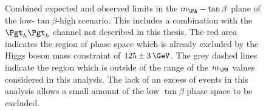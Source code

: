 \begin{figure}
\begin{center}

\end{center}
\caption[Combined expected and observed limits in the $m_{\PA}-\tan\beta$ plane
of the low-$\tan\beta$-high scenario.]{
Combined expected and observed limits in the $m_{\PA}-\tan\beta$ plane
of the low-$\tan\beta$-high scenario.
This includes a combination with the $\tautau$ channel not
described in this thesis. The red area indicates the region of phase space which is already
excluded by the Higgs boson mass constraint of $125\pm3\,\GeV$. The grey dashed
lines indicate the region which is outside of the range of the $m_{\PH}$ values
considered in this analysis. The lack of an excess of events in this analysis
allows a small amount of the low $\tan\beta$ phase space to be excluded.}
\label{fig:lowtanbhigh}
\end{figure}
